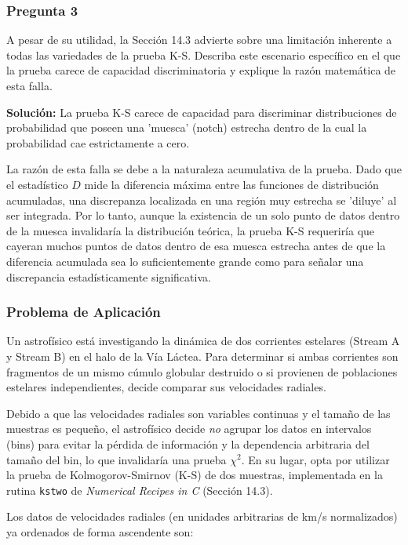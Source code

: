 \documentclass[a4paper]{article}
\begin{document}
\subsubsection{Pregunta 3}
A pesar de su utilidad, la Sección 14.3 advierte sobre una limitación inherente a todas las variedades de la prueba K-S. Describa este escenario específico en el que la prueba carece de capacidad discriminatoria y explique la razón matemática de esta falla.

\textbf{Solución:}
La prueba K-S carece de capacidad para discriminar distribuciones de probabilidad que poseen una 'muesca' (notch) estrecha dentro de la cual la probabilidad cae estrictamente a cero. 

La razón de esta falla se debe a la naturaleza acumulativa de la prueba. Dado que el estadístico $D$ mide la diferencia máxima entre las funciones de distribución acumuladas, una discrepanza localizada en una región muy estrecha se 'diluye' al ser integrada. Por lo tanto, aunque la existencia de un solo punto de datos dentro de la muesca invalidaría la distribución teórica, la prueba K-S requeriría que cayeran muchos puntos de datos dentro de esa muesca estrecha antes de que la diferencia acumulada sea lo suficientemente grande como para señalar una discrepancia estadísticamente significativa.


\subsubsection{Problema de Aplicación}
Un astrofísico está investigando la dinámica de dos corrientes estelares (Stream A y Stream B) en el halo de la Vía Láctea. Para determinar si ambas corrientes son fragmentos de un mismo cúmulo globular destruido o si provienen de poblaciones estelares independientes, decide comparar sus velocidades radiales. 

Debido a que las velocidades radiales son variables continuas y el tamaño de las muestras es pequeño, el astrofísico decide \textit{no} agrupar los datos en intervalos (bins) para evitar la pérdida de información y la dependencia arbitraria del tamaño del bin, lo que invalidaría una prueba $\chi^2$. En su lugar, opta por utilizar la prueba de Kolmogorov-Smirnov (K-S) de dos muestras, implementada en la rutina \texttt{kstwo} de \textit{Numerical Recipes in C} (Sección 14.3).

Los datos de velocidades radiales (en unidades arbitrarias de km/s normalizados) ya ordenados de forma ascendente son:
\end{document}
